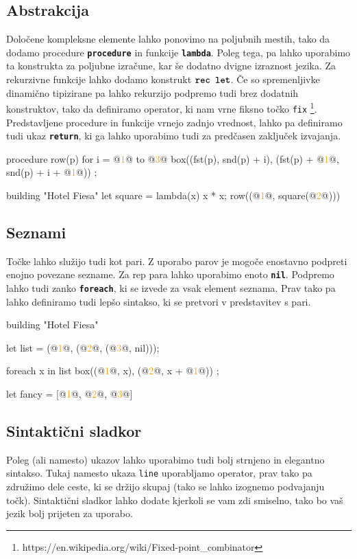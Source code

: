 \documentclass{article}
\newcommand\Num[1]{\textcolor{orange}{#1}}
\newcommand\Keyword[1]{{\textbf{\texttt{#1}}}}
\newcommand\Fun[1]{{\texttt{#1}}}
\begin{document}
\subsection{Abstrakcija}
Določene kompleksne elemente lahko ponovimo na poljubnih mestih, tako da dodamo procedure \Keyword{procedure} in funkcije \Keyword{lambda}.
Poleg tega, pa lahko uporabimo ta konstrukta za poljubne izračune, kar še dodatno dvigne izraznost jezika.
Za rekurzivne funkcije lahko dodamo konstrukt $\Keyword{rec let}$.
Če so spremenljivke dinamično tipizirane pa lahko rekurzijo podpremo tudi brez dodatnih konstruktov, tako da definiramo operator, ki nam vrne fiksno točko \Fun{fix} \footnote{https://en.wikipedia.org/wiki/Fixed-point\_combinator}.
Predstavljene procedure in funkcije vrnejo zadnjo vrednost, lahko pa definiramo tudi ukaz \Keyword{return}, ki ga lahko uporabimo tudi za predčasen zaključek izvajanja.

\begin{CITY}
  procedure row(p) {
    for i = @\Num{1}@ to @\Num{3}@ {
      box((fst(p), snd(p) + i), (fst(p) + @\Num{1}@, snd(p) + i + @\Num{1}@))
    }
  };

  building "Hotel Fiesa" {
    let square = lambda(x) {x * x};
    row((@\Num{1}@, square(@\Num{2}@)))
  }
\end{CITY}

\subsection{Seznami}
Točke lahko služijo tudi kot pari.
Z uporabo parov je mogoče enostavno podpreti enojno povezane sezname.
Za rep para lahko uporabimo enoto \Keyword{nil}.
Podpremo lahko tudi zanko \Keyword{foreach}, ki se izvede za vsak element seznama.
Prav tako pa lahko definiramo tudi lepšo sintakso, ki se pretvori v predstavitev s pari.

\begin{CITY}
  building "Hotel Fiesa" {
    let list = (@\Num{1}@, (@\Num{2}@, (@\Num{3}@, nil)));

    foreach x in list {
      box((@\Num{1}@, x), (@\Num{2}@, x + @\Num{1}@))
    };

    let fancy = [@\Num{1}@, @\Num{2}@, @\Num{3}@]
  }
\end{CITY}


\subsection{Sintaktični sladkor}
Poleg (ali namesto) ukazov lahko uporabimo tudi bolj strnjeno in elegantno sintakso.
Tukaj namesto ukaza \Fun{line} uporabljamo operator, prav tako pa združimo dele ceste, ki se držijo skupaj (tako se lahko izognemo podvajanju točk).
Sintaktični sladkor lahko dodate kjerkoli se vam zdi smiselno, tako bo vaš jezik bolj prijeten za uporabo.
\end{document}
